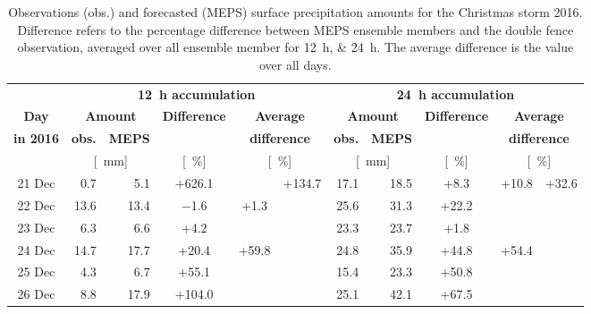 \begin{table}[!t]
	\begin{center}
		\caption{Observations (obs.) and forecasted (MEPS) surface precipitation amounts for the Christmas storm 2016. Difference refers to the percentage difference between MEPS ensemble members and the double fence observation, averaged over all ensemble member for \SIlist{12;24}{\hour}. The average difference is the value over all days.}\label{tab:res:MEPS_err}
		\begin{tabular}{c||r|r|c|c|c||r|r|c|c|c}
			\hline \hline
			& \multicolumn{5}{c||}{\textbf{\SI{12}{\hour} accumulation}} & \multicolumn{5}{c}{\textbf{\SI{24}{\hour} accumulation}}    \\ \cline{2-11}
			\textbf{Day} & \multicolumn{2}{c|}{\textbf{Amount}} & \textbf{Difference} & \multicolumn{2}{c||}{\textbf{Average}} &  \multicolumn{2}{c|}{\textbf{Amount}} & \textbf{Difference} & \multicolumn{2}{c}{\textbf{Average}}  \\\cline{2-3} \cline{7-8}
			\textbf{in 2016} & \textbf{obs.} & \textbf{MEPS} & & \multicolumn{2}{c||}{\textbf{difference}} & \textbf{obs.} & \textbf{MEPS} & & \multicolumn{2}{c}{\textbf{difference}} \\\cline{2-11}
			& \multicolumn{2}{c|}{[\SI{}{\mm}]} & [\SI{}{\percent}] & \multicolumn{2}{c||}{ [\SI{}{\percent}]} & \multicolumn{2}{c|}{[\SI{}{\mm}]} & [\SI{}{\percent}] & \multicolumn{2}{c}{ [\SI{}{\percent}]} \\ \hline\hline
			\num{21} Dec & \num{0.7} & \num{5.1} & +\num{626.1} &  &\multirow{6}{*}{+\num{134.7}} & \num{17.1} & \num{18.5} & +\num{8.3} & \multirow{3}{*}{+\num{10.8}}& \multirow{6}{*}{+\num{32.6}}   \\\cline{1-5}\cline{7-9} 
			\num{22} Dec & \num{13.6} & \num{13.4} & \num{-1.6} & \multirow{2}{*}{+\num{1.3}} & & \num{25.6} & \num{31.3} & +\num{22.2} &  &  \\\cline{1-4}\cline{7-9}
			\num{23} Dec & \num{6.3} & \num{6.6} & +\num{4.2} & & & \num{23.3} & \num{23.7} & +\num{1.8} &  &  \\\cline{1-5}\cline{7-10}
			\num{24} Dec & \num{14.7} & \num{17.7} & +\num{20.4} & \multirow{3}{*}{+\num{59.8}} & & \num{24.8} & \num{35.9} & +\num{44.8} & \multirow{3}{*}{+\num{54.4}}  &  \\\cline{1-4}\cline{7-9}
			\num{25} Dec & \num{4.3} & \num{6.7} & +\num{55.1} & & & \num{15.4} & \num{23.3} & +\num{50.8} & &   \\\cline{1-4}\cline{7-9}
			\num{26} Dec & \num{8.8} & \num{17.9} & +\num{104.0} & & & \num{25.1} & \num{42.1} & +\num{67.5} &  &  \\\hline\hline
		\end{tabular}
	\end{center}
\end{table}
